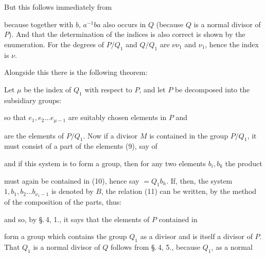 But this follows immediately from


because together with $b$, $a^{-1} b a$ also occurs in $Q$ (because $Q$ is a
normal divisor of $P$). And that the determination of the
indices is also correct is shown by the enumeration. For the degrees of
$P/Q_1$ and $Q/Q_1$ are $\nu \nu_1$ and $\nu_1$, hence the index is $\nu$.

Alongside this there is the following theorem:


Let $\mu$ be the index of $Q_1$ with respect to $P$, and let $P$ be
decomposed into the subsidiary groups:


so that $e_1, e_2 \ldots e_{\mu - 1}$ are suitably chosen elements in $P$ and


are the elements of $P/Q_1$. Now if a divisor $M$ is contained in
the group $P/Q_1$, it must consist of a part
of the elements (9), say of


and if this system is to form a group, then for
any two elements $b_i, b_k$ the product


must again be contained in (10), hence say $= Q_1 b_h$. If, then,
the system $1, b_1, b_2 \ldots b_{\nu_1 - 1}$ is denoted by $B$, the relation
 (11) can be written, by the method of the composition of the parts,
thus:


and so, by \S.\,4, 1., it says that the elements of $P$ contained in


form a group which contains the group
$Q_1$ as a divisor and is itself a divisor of $P$. That
$Q_1$ is a normal divisor of $Q$ follows from \S.\,4, 5., because $Q_1$, as a normal
